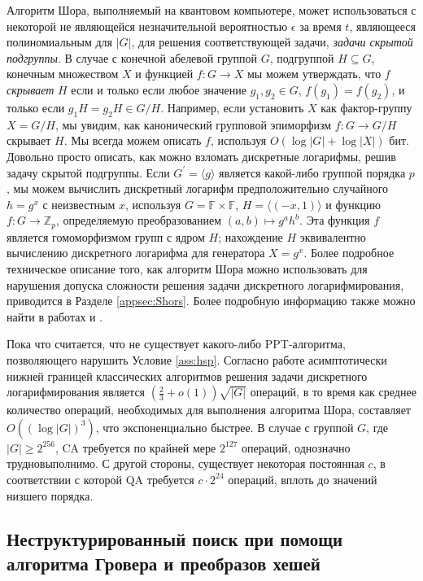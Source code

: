\documentclass{mrl}
\begin{document}
Алгоритм Шора, выполняемый на квантовом компьютере, может использоваться с некоторой не являющейся незначительной вероятностью $\epsilon$ за время $t$, являющееся полиномиальным для $\left|G\right|$, для решения соответствующей задачи, \textit{задачи скрытой подгруппы}. В случае с конечной абелевой группой $G$, подгруппой $H \subseteq G$, конечным множеством $X$ и функцией $f:G \to X$ мы можем утверждать, что $f$ \textit{скрывает} $H$ если и только если любое значение $g_1, g_2 \in G$, $f(g_1) = f(g_2)$, и только если $g_1H = g_2 H \in G/H$. Например, если установить $X$ как фактор-группу $X=G/H$, мы увидим, как канонический групповой эпиморфизм $f:G \to G/H$ скрывает $H$. Мы всегда можем описать $f$, используя $O(\log\left|G\right| + \log\left|X\right|)$ бит. 
Довольно просто описать, как можно взломать дискретные логарифмы, решив задачу скрытой подгруппы. Если $G^\prime = \langle g\rangle$ является какой-либо группой порядка $p$, мы можем вычислить дискретный логарифм предположительно случайного $h = g^x$ с неизвестным $x$, используя $G = \mathbb{F} \times \mathbb{F}$, $H = \langle(-x,1)\rangle$ и функцию $f: G \to \mathbb{Z}_p$, определяемую преобразованием $(a, b) \mapsto g^a h^b$. Эта функция $f$ является гомоморфизмом групп с ядром $H$; нахождение $H$ эквивалентно вычислению дискретного логарифма для генератора $X = g^x$. Более подробное техническое описание того, как алгоритм Шора можно использовать для нарушения допуска сложности решения задачи дискретного логарифмирования, приводится в Разделе \ref{appsec:Shors}. Более подробную информацию также можно найти в работах \cite{proos2003Shor} и \cite{mosca2008quantum}.

Пока что считается, что не существует какого-либо PPT-алгоритма, позволяющего нарушить Условие \ref{ass:hsp}. Согласно работе \cite{galbraith2016recent} асимптотически нижней границей классических алгоритмов решения задачи дискретного логарифмирования является $(\frac{2}{3} + o(1))\sqrt{\left|G\right|}$ операций, в то время как среднее количество операций, необходимых для выполнения алгоритма Шора, составляет $O((\log\left|G\right|)^3)$, что экспоненциально быстрее. В случае с группой $G$, где $\left|G\right| \geq 2^{256}$, CA требуется по крайней мере $2^{127}$ операций, однозначно трудновыполнимо. С другой стороны, существует некоторая постоянная $c$, в соответствии с которой QA требуется $c \cdot 2^{24}$ операций, вплоть до значений низшего порядка.

\subsection{Неструктурированный поиск при помощи алгоритма Гровера и преобразов хешей}\label{subsec:groversalgo}
\end{document}
